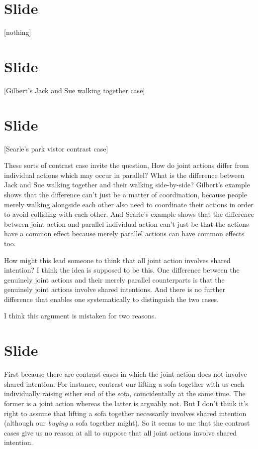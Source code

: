 \documentclass[12pt,\papersize]{extarticle}
\begin{document}
\section{Slide}
[nothing]


\section{Slide}
[Gilbert's Jack and Sue walking together case]


\section{Slide}
[Searle's park vistor contrast case]

These sorts of contrast case invite the question, 
How do joint actions differ from individual actions which may occur in parallel? 
What is the difference between Jack and Sue walking together and their walking side-by-side?  
Gilbert’s example shows that the difference can’t just be a matter of coordination, because people merely walking alongside each other also need to coordinate their actions in order to avoid colliding with each other.  
And Searle’s example shows that the difference between joint action and parallel individual action can’t just be that the actions have a common effect because merely parallel actions can have common effects too. 

How might this lead someone to think that all joint action involves shared intention?
I think the idea is supposed to be this.
One difference between the genuinely joint actions and their merely parallel counterparts is that the genuinely joint actions involve shared intentions.
And there is no further difference that enables one systematically to distinguish the two cases.

I think this argument is mistaken for two reasons.


\section{Slide}
First because there are contrast cases in which the joint action does not involve shared intention.
For instance, contrast our lifting a sofa together with us each individually raising either end of the sofa, coincidentally at the same time.
The former is a joint action whereas the latter is arguably not.
But I don't think it's right to assume that lifting a sofa together necessarily involves shared intention (although our \emph{buying} a sofa together might).
So it seems to me that the contrast cases give us no reason at all to suppose that all joint actions involve shared intention.
\end{document}
